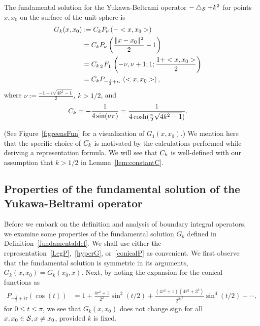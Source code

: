 \begin{definition}
\label{fundamentaldef} 
The fundamental solution for the Yukawa-Beltrami operator $-\lap_\S +
k^2$ for points $x,x_0$ on the surface of the unit sphere is 
\begin{subequations}
  \begin{align}
    G_k(x,x_{0})&:=\C P_{\nu}\left(-<x,x_{0}>\right) \nonumber \\
    &=\C P_{\nu}\left(\frac{\|x-x_{0}\|^2}{2}-1\right) \label{LegP} \\
    &= \C\, \tensor[_2]{F}{_1} \left(-\nu, \nu+1; 1; 
      \frac{1+<x,x_{0}>}{2}\right)\label{hyperG} \\
    &=\C P_{-\frac{1}{2} + i \tau}
    \left(<x,x_{0}>\right) \label{conicalP},
  \end{align} 
\end{subequations}
where 
$\nu:=\frac{-1+i\sqrt{4k^2-1}}{2}$, $k>1/2$, and 
\begin{align}
  \label{constant-definition}    
  \C=-\frac{1}{4\sin(\nu\pi)} 
    =\frac{1}{4\cosh(\frac{\pi}{2}\sqrt{4k^2-1})}.
\end{align}
\end{definition} 
(See Figure~\ref{f:greensFun} for a visualization of $G_1(x,x_0)$.) We
mention here that the specific choice of $\C$ is motivated by the
calculations performed while deriving a representation formula.  We will
see that $\C$ is well-defined with our assumption that $k>1/2$ in
Lemma~\ref{lem:constantC}.


\subsection{Properties of the fundamental solution of the
Yukawa-Beltrami operator}
Before we embark on the definition and analysis of boundary integral
operators, we examine some properties of the fundamental solution $G_k$
defined in Definition~\ref{fundamentaldef}. We shall use either the
representation~\eqref{LegP},~\eqref{hyperG}, or~\eqref{conicalP} as
convenient.  We first observe that the fundamental solution is symmetric
in its arguments, $G_k(x,x_{0}) = G_k(x_{0},x)$. Next, by noting the
expansion for the conical functions as~\cite{lebedev}
\begin{align*}
  P_{-\frac{1}{2}+i \tau} (\cos(t)) &= 1+
    \frac{4\tau^2+1}{2^2}\sin^2(t/2) + 
      \frac{(4\tau^2+1)(4\tau^2+3^2)}{2^24^2}\sin^4(t/2) + 
    \cdots,
\end{align*}
for $0\leq t\leq \pi$, we see that $G_k(x,x_0)$ does not change sign for
  all $x,x_{0} \in \S, x \neq x_{0}$, provided $k$ is fixed.

